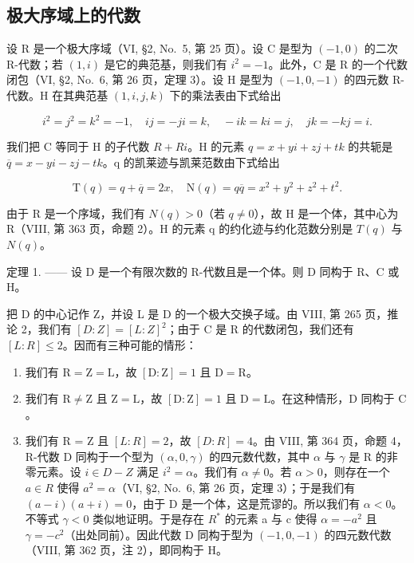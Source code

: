 \subsection{极大序域上的代数}

设 R 是一个极大序域（VI, §2, No.~5, 第 25 页）。设 C 是型为 \((-1,0)\) 的二次 R-代数；若 \((1,i)\) 是它的典范基，则我们有 \(i^{2}=-1\)。此外，C 是 R 的一个代数闭包（VI, §2, No.~6, 第 26 页，定理 3）。设 H 是型为 \((-1,0,-1)\) 的四元数 R-代数。H 在其典范基 \((1,i,j,k)\) 下的乘法表由下式给出

\[
i ^ {2} = j ^ {2} = k ^ {2} = - 1, \quad i j = - j i = k, \quad - i k = k i = j, \quad j k = - k j = i.
\]

我们把 C 等同于 H 的子代数 \(R + Ri\)。H 的元素 \(q = x + yi + zj + tk\) 的共轭是 \(\overline{q} = x - yi - zj - tk\)。q 的凯莱迹与凯莱范数由下式给出

\[
\mathrm{T} (q) = q + \overline {{q}} = 2 x, \quad \mathrm{N} (q) = q \overline {{q}} = x ^ {2} + y ^ {2} + z ^ {2} + t ^ {2}.
\]

由于 R 是一个序域，我们有 \(N(q) > 0\)（若 \(q \neq 0\)），故 H 是一个体，其中心为 R（VIII, 第 363 页，命题 2）。H 的元素 q 的约化迹与约化范数分别是 \(T(q)\) 与 \(N(q)\)。

定理 1. —— 设 D 是一个有限次数的 R-代数且是一个体。则 D 同构于 R、C 或 H。

把 D 的中心记作 Z，并设 L 是 D 的一个极大交换子域。由 VIII, 第 265 页，推论 2，我们有 \([D:Z]=[L:Z]^{2}\)；由于 C 是 R 的代数闭包，我们还有 \([L:R]\leqslant2\)。因而有三种可能的情形：

\begin{enumerate}
\def\labelenumi{\alph{enumi})}
\item
  我们有 \(\mathrm{R} = \mathrm{Z} = \mathrm{L}\)，故 \([\mathrm{D}:\mathrm{Z}] = 1\) 且 \(\mathrm{D} = \mathrm{R}\)。
\item
  我们有 \(\mathrm{R} \neq \mathrm{Z}\) 且 \(\mathrm{Z} = \mathrm{L}\)，故 \([\mathrm{D} : \mathrm{Z}] = 1\) 且 \(\mathrm{D} = \mathrm{L}\)。在这种情形，\(\mathrm{D}\) 同构于 \(\mathrm{C}\)。
\item
  我们有 R = Z 且 \([L : R] = 2\)，故 \([D : R] = 4\)。由 VIII, 第 364 页，命题 4，R-代数 D 同构于一个型为 \((\alpha, 0, \gamma)\) 的四元数代数，其中 \(\alpha\) 与 \(\gamma\) 是 R 的非零元素。设 \(i \in D - Z\) 满足 \(i^{2} = \alpha\)。我们有 \(\alpha \neq 0\)。若 \(\alpha > 0\)，则存在一个 \(a \in R\) 使得 \(a^{2} = \alpha\)（VI, §2, No.~6, 第 26 页，定理 3）；于是我们有 \((a - i)(a + i) = 0\)，由于 D 是一个体，这是荒谬的。所以我们有 \(\alpha < 0\)。不等式 \(\gamma < 0\) 类似地证明。于是存在 \(R^{*}\) 的元素 a 与 c 使得 \(\alpha = -a^{2}\) 且 \(\gamma = -c^{2}\)（出处同前）。因此代数 D 同构于型为 \((-1,0,-1)\) 的四元数代数（VIII, 第 362 页，注 2），即同构于 H。
\end{enumerate}

